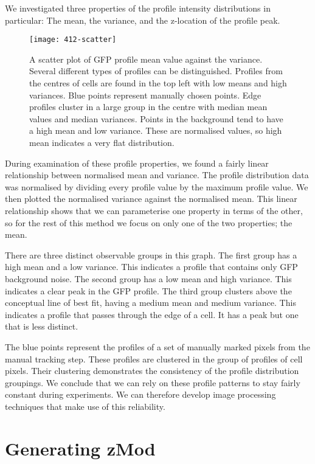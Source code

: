 We investigated three properties of the profile intensity distributions in particular: The mean, the variance, and the z-location of the profile peak.

\begin{figure}[htbp!]
\centering
\texttt{[image: 412-scatter]}
\caption[GFP profile types scatter plot]{A scatter plot of GFP profile mean value against the variance. Several different types of profiles can be distinguished. Profiles from the centres of cells are found in the top left with low means and high variances. Blue points represent manually chosen points. Edge profiles cluster in a large group in the centre with median mean values and median variances. Points in the background tend to have a high mean and low variance. These are normalised values, so high mean indicates a very flat distribution.}
\label{fig:gfp_profile_scatter}
\end{figure}

During examination of these profile properties, we found a fairly linear relationship between normalised mean and variance. The profile distribution data was normalised by dividing every profile value by the maximum profile value. We then plotted the normalised variance against the normalised mean. This linear relationship shows that we can parameterise one property in terms of the other, so for the rest of this method we focus on only one of the two properties; the mean.

There are three distinct observable groups in this graph. The first group has a high mean and a low variance. This indicates a profile that contains only GFP background noise. The second group has a low mean and high variance. This indicates a clear peak in the GFP profile. The third group clusters above the conceptual line of best fit, having a medium mean and medium variance. This indicates a profile that passes through the edge of a cell. It has a peak but one that is less distinct.

The blue points represent the profiles of a set of manually marked pixels from the manual tracking step. These profiles are clustered in the group of profiles of cell pixels. Their clustering demonstrates the consistency of the profile distribution groupings. We conclude that we can rely on these profile patterns to stay fairly constant during experiments. We can therefore develop image processing techniques that make use of this reliability.

\section{Generating zMod}

